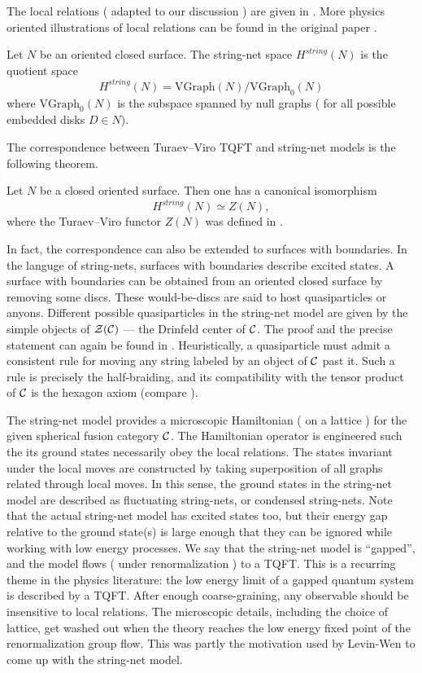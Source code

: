 The local relations ( adapted to our discussion ) are given in . More physics
oriented illustrations of local relations can be found in the original paper \cite{levin-wen}.

\begin{definition}
	Let $N$ be an oriented closed surface. The string-net space $H^{string}(N)$ is the quotient space
	\[
		H^{string}(N) = \mathrm{VGraph}(N)/\mathrm{VGraph}_0(N)
	\]
	where $\mathrm{VGraph}_0(N)$ is the subspace spanned by null graphs ( for all possible embedded 
	disks $D \in N$).
\end{definition}

The correspondence between Turaev--Viro TQFT and string-net models is the 
following theorem.

\begin{theorem}\label{t:tv-equals-stringnet}
	Let $N$ be a closed oriented surface. Then one has a canonical isomorphism
	\[
		H^{string}(N) \simeq Z(N),
	\]
	where the Turaev--Viro functor $Z(N)$ was defined in .
\end{theorem}

In fact, the correspondence can also be extended to surfaces with boundaries. 
In the languge of string-nets, surfaces with boundaries describe excited states. 
A surface with boundaries can be obtained from an oriented closed surface
by removing some discs. These would-be-discs are said to host quasiparticles 
or anyons. Different possible quasiparticles in the string-net model are given 
by the simple objects of $\mathcal{Z}(\mathcal{C})$ --- the Drinfeld center of $\mathcal{C}$. 
The proof and the precise statement can again be found in \cite{kirillov-stringnet}.
Heuristically, a quasiparticle must admit a consistent rule for moving any string labeled
by an object of $\mathcal{C}$ past it. Such a rule is precisely the half-braiding, and its
compatibility with the tensor product of $\mathcal{C}$ is the hexagon axiom 
(compare ).

The string-net model provides a microscopic Hamiltonian ( on a lattice ) for the given
spherical fusion category $\mathcal{C}$. The 
Hamiltonian operator is engineered such the its
ground states necessarily obey the local relations. The states invariant under
the local moves are constructed by taking superposition of all graphs
related through local moves. In this sense, the ground states in the string-net model are
described as fluctuating string-nets, or condensed string-nets. Note that the actual 
string-net model has excited states too, but their energy gap relative to the
ground state(s) is large enough that they can be ignored while working with low
energy processes. We say that the string-net model is ``gapped'', and the model
flows ( under renormalization ) to a TQFT.
This is a recurring theme in the physics literature: the low energy
limit of a gapped quantum system is described by a TQFT. After enough coarse-graining,
any observable should be insensitive to local relations. The microscopic details,
including the choice of lattice, get washed out when the theory reaches the low energy 
fixed point of the renormalization group flow. This was partly the motivation used by Levin-Wen 
to come up with the string-net model.



